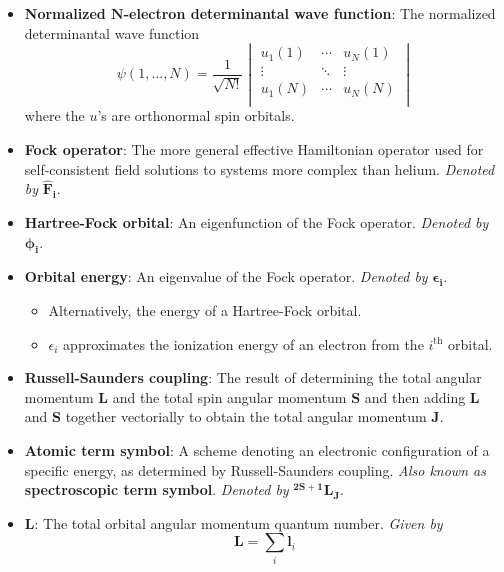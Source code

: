 \documentclass[../notes.tex]{subfiles}
\begin{document}
\begin{itemize}
\begin{itemize}
    \end{itemize}
    \item \textbf{Normalized $\bm{N}$-electron determinantal wave function}: The normalized determinantal wave function
    \begin{equation*}
        \psi(1,\dots,N) = \frac{1}{\sqrt{N!}}
        \begin{vmatrix}
            u_1(1) & \cdots & u_N(1)\\
            \vdots & \ddots & \vdots\\
            u_1(N) & \cdots & u_N(N)\\
        \end{vmatrix}
    \end{equation*}
    where the $u$'s are orthonormal spin orbitals.
    \item \textbf{Fock operator}: The more general effective Hamiltonian operator used for self-consistent field solutions to systems more complex than helium. \emph{Denoted by} $\bm{\hat{F}_i}$.
    \item \textbf{Hartree-Fock orbital}: An eigenfunction of the Fock operator. \emph{Denoted by} $\bm{\phi_i}$.
    \item \textbf{Orbital energy}: An eigenvalue of the Fock operator. \emph{Denoted by} $\bm{\epsilon_i}$.
    \begin{itemize}
        \item Alternatively, the energy of a Hartree-Fock orbital.
        \item $\epsilon_i$ approximates the ionization energy of an electron from the $i^\text{th}$ orbital.
    \end{itemize}
    \item {}\textbf{Russell-Saunders coupling}: The result of determining the total angular momentum $\mathbf{L}$ and the total spin angular momentum $\mathbf{S}$ and then adding $\mathbf{L}$ and $\mathbf{S}$ together vectorially to obtain the total angular momentum $\mathbf{J}$.
    \item \textbf{Atomic term symbol}: A scheme denoting an electronic configuration of a specific energy, as determined by Russell-Saunders coupling. \emph{Also known as} \textbf{spectroscopic term symbol}. \emph{Denoted by} $\bm{{}^{2S+1}L_J}$.
    \item $\bm{L}$: The total orbital angular momentum quantum number. \emph{Given by}
    \begin{equation*}
        \mathbf{L} = \sum_i\mathbf{l}_i
    \end{equation*}

\end{itemize}
\end{document}
